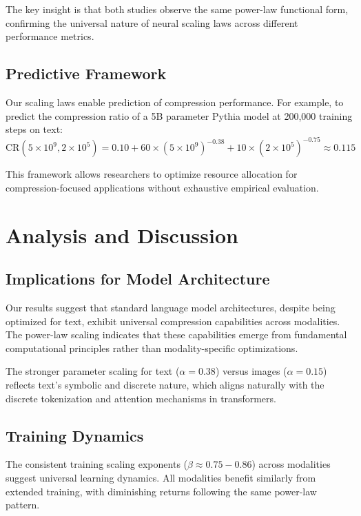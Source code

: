 \documentclass[11pt]{article}
\begin{document}
The key insight is that both studies observe the same power-law functional form, confirming the universal nature of neural scaling laws across different performance metrics.

\subsection{Predictive Framework}

Our scaling laws enable prediction of compression performance. For example, to predict the compression ratio of a 5B parameter Pythia model at 200,000 training steps on text:
\[
\mathrm{CR}(5 \times 10^9, 2 \times 10^5) = 0.10 + 60 \times (5 \times 10^9)^{-0.38} + 10 \times (2 \times 10^5)^{-0.75} \approx 0.115
\]

This framework allows researchers to optimize resource allocation for compression-focused applications without exhaustive empirical evaluation.

\section{Analysis and Discussion}

\subsection{Implications for Model Architecture}

Our results suggest that standard language model architectures, despite being optimized for text, exhibit universal compression capabilities across modalities. The power-law scaling indicates that these capabilities emerge from fundamental computational principles rather than modality-specific optimizations.

The stronger parameter scaling for text ($\alpha = 0.38$) versus images ($\alpha = 0.15$) reflects text's symbolic and discrete nature, which aligns naturally with the discrete tokenization and attention mechanisms in transformers.

\subsection{Training Dynamics}

The consistent training scaling exponents ($\beta \approx 0.75-0.86$) across modalities suggest universal learning dynamics. All modalities benefit similarly from extended training, with diminishing returns following the same power-law pattern.
\end{document}
